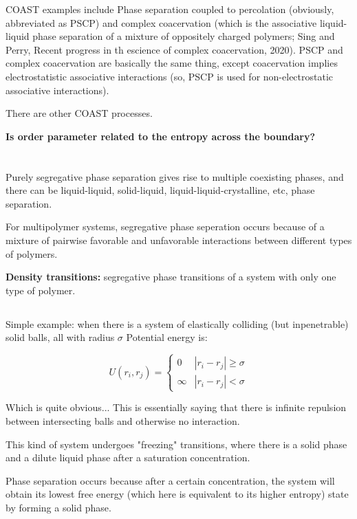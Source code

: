 \documentclass{article}
\begin{document}
COAST examples include Phase separation coupled to percolation (obviously, abbreviated as PSCP) and complex coacervation (which is the associative liquid-liquid phase separation of a mixture of oppositely charged polymers; Sing and Perry, Recent progress in th escience of complex coacervation, 2020). PSCP and complex coacervation are basically the same thing, except coacervation implies electrostatistic associative interactions (so, PSCP is used for non-electrostatic associative interactions).

There are other COAST processes.

\textbf{Is order parameter related to the entropy across the boundary?}

\section{}

Purely segregative phase separation gives rise to multiple coexisting phases, and there can be liquid-liquid, solid-liquid, liquid-liquid-crystalline, etc, phase separation.

For multipolymer systems, segregative phase seperation occurs because of a mixture of pairwise favorable and unfavorable interactions between different types of polymers.

\textbf{Density transitions: } segregative phase transitions of a system with only one type of polymer.

\subsection{}

Simple example: when there is a system of elastically colliding (but inpenetrable) solid balls, all with radius $\sigma$ Potential energy is:

\[U(r_i,r_j)=\begin{cases}
    0 & |r_i-r_j| \geq \sigma\\
    \infty & |r_i-r_j| < \sigma
\end{cases}\]

Which is quite obvious... This is essentially saying that there is infinite repulsion between intersecting balls and otherwise no interaction.

This kind of system undergoes "freezing" transitions, where there is a solid phase and a dilute liquid phase after a saturation concentration.

Phase separation occurs because after a certain concentration, the system will obtain its lowest free energy (which here is equivalent to its higher entropy) state by forming a solid phase.
\end{document}
